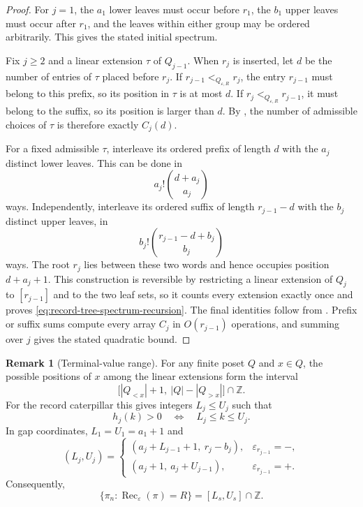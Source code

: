 \documentclass[11pt,letterpaper,reqno]{amsart}
\theoremstyle{definition}
\newtheorem{remark}[theorem]{Remark}
\newcommand{\eps}{\varepsilon}
\begin{document}
\begin{proof}
For \(j=1\), the \(a_1\) lower leaves must occur before \(r_1\), the \(b_1\)
upper leaves must occur after \(r_1\), and the leaves within either group may
be ordered arbitrarily.  This gives the stated initial spectrum.

Fix \(j\ge2\) and a linear extension \(\tau\) of \(Q_{j-1}\).  When \(r_j\)
is inserted, let \(d\) be the number of entries of \(\tau\) placed before
\(r_j\).  If \(r_{j-1}<_{Q_{\eps,R}}r_j\), the entry \(r_{j-1}\) must belong
to this prefix, so its position in \(\tau\) is at most \(d\).  If
\(r_j<_{Q_{\eps,R}}r_{j-1}\), it must belong to the suffix, so its position is
larger than \(d\).  By , the number of admissible
choices of \(\tau\) is therefore exactly \(C_j(d)\).

For a fixed admissible \(\tau\), interleave its ordered prefix of length \(d\)
with the \(a_j\) distinct lower leaves.  This can be done in
\[
a_j!\binom{d+a_j}{a_j}
\]
ways.  Independently, interleave its ordered suffix of length
\(r_{j-1}-d\) with the \(b_j\) distinct upper leaves, in
\[
b_j!\binom{r_{j-1}-d+b_j}{b_j}
\]
ways.  The root \(r_j\) lies between these two words and hence occupies
position \(d+a_j+1\).  This construction is reversible by restricting a
linear extension of \(Q_j\) to \([r_{j-1}]\) and to the two leaf sets, so it
counts every extension exactly once and proves
\eqref{eq:record-tree-spectrum-recursion}.  The final identities follow from
.  Prefix or suffix sums compute every
array \(C_j\) in \(O(r_{j-1})\) operations, and summing over \(j\) gives the
stated quadratic bound.
\end{proof}

\begin{remark}[Terminal-value range]\label{cor:terminal-value-interval}
For any finite poset \(Q\) and \(x\in Q\), the possible positions of \(x\)
among the linear extensions form the interval
\[
\bigl[|Q_{<x}|+1,\ |Q|-|Q_{>x}|\bigr]\cap\mathbb Z.
\]
For the record caterpillar this gives integers \(L_j\le U_j\) such that
\[
h_j(k)>0\quad\Longleftrightarrow\quad L_j\le k\le U_j.
\]
In gap coordinates, \(L_1=U_1=a_1+1\) and
\[
(L_j,U_j)=
\begin{cases}
(a_j+L_{j-1}+1,\ r_j-b_j),&\eps_{r_{j-1}}=-,\\
(a_j+1,\ a_j+U_{j-1}),&\eps_{r_{j-1}}=+.
\end{cases}
\]
Consequently,
\[
\{\pi_n:\operatorname{Rec}_\eps(\pi)=R\}=[L_s,U_s]\cap\mathbb Z.
\]
\end{remark}
\end{document}

